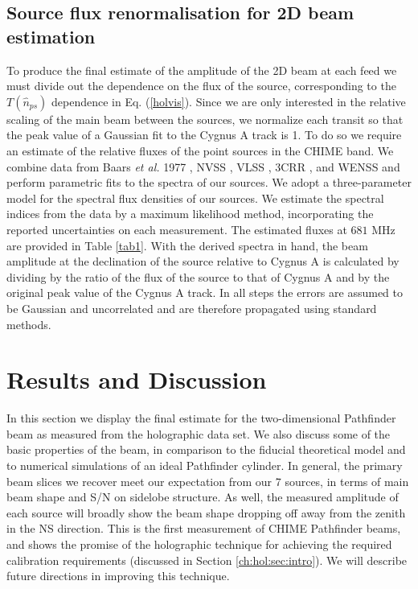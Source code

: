 \subsection{Source flux renormalisation for 2D beam estimation}

To produce the final estimate of the amplitude of the 2D beam at each feed we must divide out the dependence on the flux of the source, corresponding to the $T(\hat{n}_{ps})$ dependence in Eq. (\ref{holvis}). Since we are only interested in the relative scaling of the main beam between the sources, we normalize each transit so that the peak value of a Gaussian fit to the Cygnus A track is 1. To do so we require an estimate of the relative fluxes of the point sources in the CHIME band. We combine data from Baars {\it et al.} 1977 \citep{baars}, NVSS \citep{NVSS}, VLSS \citep{VLSS}, 3CRR \citep{3CRR}, and WENSS \citep{WENSS} and perform parametric fits to the spectra of our sources. We adopt a three-parameter model for the spectral flux densities of our sources. We estimate the spectral indices from the data by a maximum likelihood method, incorporating the reported uncertainties on each measurement. The estimated fluxes at $681$ MHz are provided in Table \ref{tab1}. With the derived spectra in hand, the beam amplitude at the declination of the source relative to Cygnus A is calculated by dividing by the ratio of the flux of the source to that of Cygnus A and by the original peak value of the Cygnus A track. In all steps the errors are assumed to be Gaussian and uncorrelated and are therefore propagated using standard methods.

\section{Results and Discussion} \label{ch:hol:sec:results}

In this section we display the final estimate for the two-dimensional Pathfinder beam as measured from the holographic data set. We also discuss some of the basic properties of the beam, in comparison to the fiducial theoretical model and to numerical simulations of an ideal Pathfinder cylinder. In general, the primary beam slices we recover meet our expectation from our 7 sources, in terms of main beam shape and S/N on sidelobe structure. As well, the measured amplitude of each source will broadly show the beam shape dropping off away from the zenith in the NS direction. This is the first measurement of CHIME Pathfinder beams, and shows the promise of the holographic technique for achieving the required calibration requirements (discussed in Section \ref{ch:hol:sec:intro}). We will describe future directions in improving this technique.

